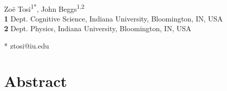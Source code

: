 \documentclass[10pt,letterpaper]{article}
\date{}
\begin{document}
\vspace*{0.2in}

\begin{flushleft}
{\Large
\textbf{} %
}
\newline
\\
Zo{\"e} Tosi\textsuperscript{1*},
John Beggs\textsuperscript{1,2}
\\
\bigskip
\textbf{1} Dept. Cognitive Science, Indiana University, Bloomington, IN, USA
\\
\textbf{2} Dept. Physics, Indiana University, Bloomington, IN, USA
\\
\bigskip

% 

* ztosi@iu.edu

\end{flushleft}
\section*{Abstract}
\end{document}
